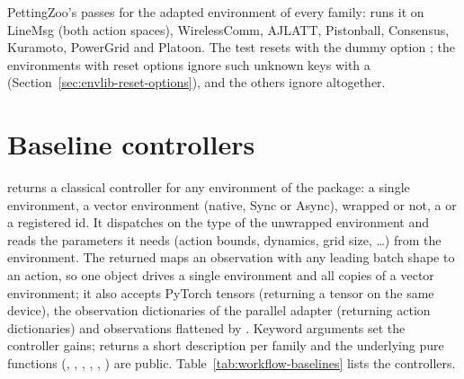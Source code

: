 PettingZoo's  passes for the adapted environment of
every family:  runs it on LineMsg (both
action spaces), WirelessComm, AJLATT, Pistonball, Consensus, Kuramoto,
PowerGrid and Platoon. The test resets with the dummy option
; the environments with reset options ignore such unknown
keys with a  (Section~\ref{sec:envlib-reset-options}), and
the others ignore  altogether.

\section{Baseline controllers}\label{sec:workflow-baselines}

 returns a classical controller
for any environment of the package: a single environment, a vector
environment (native, Sync or Async), wrapped or not, a
 or a registered id. It dispatches on the type of the
unwrapped environment and reads the parameters it needs (action bounds,
dynamics, grid size, \ldots) from the environment. The returned
 maps an observation with any leading batch shape to an
action, so one object drives a single environment and all copies of a vector
environment; it also accepts PyTorch tensors (returning a tensor on the same
device), the observation dictionaries of the parallel adapter (returning action
dictionaries) and observations flattened by .
Keyword arguments set the controller gains; 
returns a short description per family and the underlying pure functions
(, , ,
, , ) are
public. Table~\ref{tab:workflow-baselines} lists the controllers.

